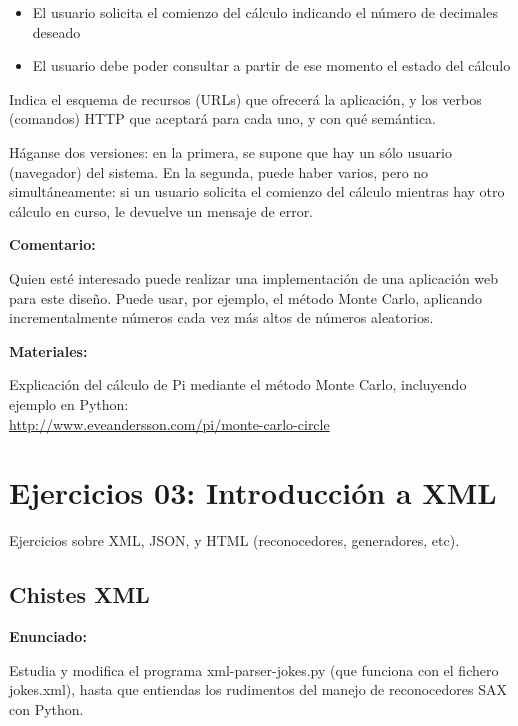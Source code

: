 \begin{itemize}
\item El usuario solicita el comienzo del cálculo indicando el número de decimales deseado
\item El usuario debe poder consultar a partir de ese momento el estado del cálculo
\end{itemize}

Indica el esquema de recursos (URLs) que ofrecerá la aplicación, y los verbos (comandos) HTTP que aceptará para cada uno, y con qué semántica.

Háganse dos versiones: en la primera, se supone que hay un sólo usuario (navegador) del sistema. En la segunda, puede haber varios, pero no simultáneamente: si un usuario solicita el comienzo del cálculo mientras hay otro cálculo en curso, le devuelve un mensaje de error.

\textbf{Comentario:}

Quien esté interesado puede realizar una implementación de una aplicación web para este diseño. Puede usar, por ejemplo, el método Monte Carlo, aplicando incrementalmente números cada vez más altos de números aleatorios.

\textbf{Materiales:}

Explicación del cálculo de Pi mediante el método Monte Carlo, incluyendo ejemplo en Python: \\
\url{http://www.eveandersson.com/pi/monte-carlo-circle}


\section{Ejercicios 03: Introducción a XML}

Ejercicios sobre XML, JSON, y HTML (reconocedores, generadores, etc).

\subsection{Chistes XML}
\label{subsec:xml-chistes}

\textbf{Enunciado:}

Estudia y modifica el programa xml-parser-jokes.py (que funciona con el fichero jokes.xml), hasta que entiendas los rudimentos del manejo de reconocedores SAX con Python.

